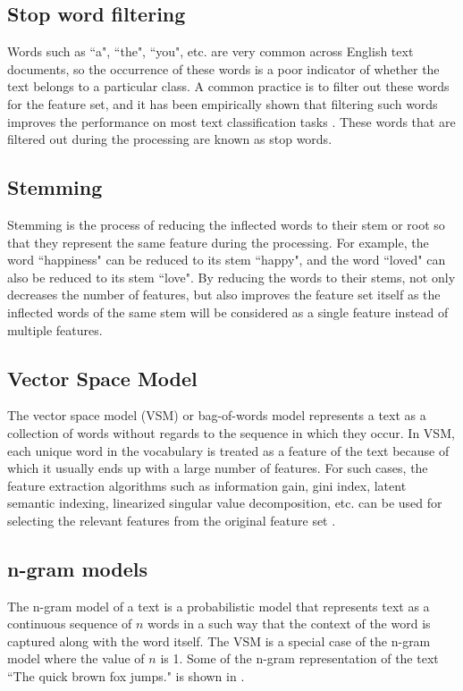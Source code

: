 \subsection{Stop word filtering}
Words such as ``a", ``the", ``you", etc. are very common across English text documents, so the occurrence of these words is a poor indicator of whether the text belongs to a particular class. A common practice is to filter out these words for the feature set, and it has been empirically shown that filtering such words improves the performance on most text classification tasks \cite{silva2003importance}. These words that are filtered out during the processing are known as stop words. 

\subsection{Stemming}
Stemming is the process of reducing the inflected words to their stem or root so that they represent the same feature during the processing. For example, the word ``happiness" can be reduced to its stem ``happy", and the word ``loved" can also be reduced to its stem ``love". By reducing the words to their stems, not only decreases the number of features, but also improves the feature set itself  as the inflected words of the same stem will be considered as a single feature instead of multiple features. 

\subsection{Vector Space Model}
The vector space model (VSM) or bag-of-words model represents a text as a collection of words without regards to the sequence in which they occur. In VSM, each unique word in the vocabulary is treated as a feature of the text because of which it usually ends up with a large number of features. For such cases, the feature extraction algorithms such as information gain, gini index, latent semantic indexing, linearized singular value decomposition, etc. can be used for selecting the relevant features from the original feature set \cite{aggarwal2012survey}.

\subsection{n-gram models}
The n-gram model of a text is a probabilistic model that represents text as a continuous sequence of $n$ words in a such way that the context of the word is captured along with the word itself. The VSM is a special case of the n-gram model where the value of $n$ is 1. Some of the n-gram representation of the text ``The quick brown fox jumps." is shown in .

